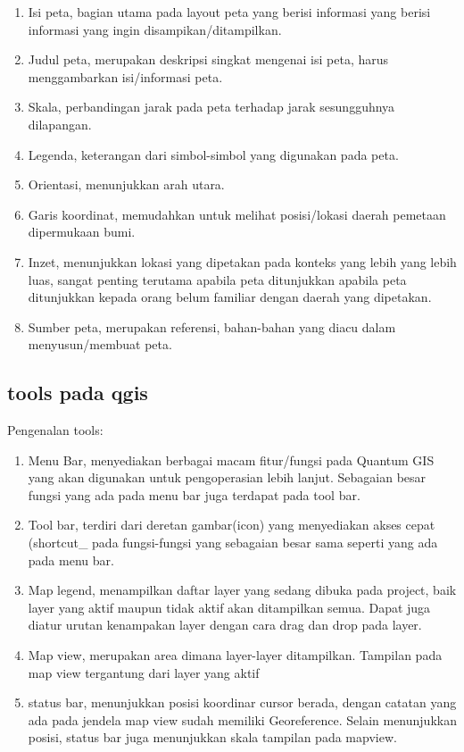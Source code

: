 	\begin{enumerate}
		\item Isi peta, bagian utama pada layout peta yang berisi informasi yang berisi informasi yang ingin disampikan/ditampilkan.
		\item Judul peta, merupakan deskripsi singkat mengenai isi peta, harus menggambarkan isi/informasi peta.
		\item Skala, perbandingan jarak pada peta terhadap jarak sesungguhnya dilapangan.
		\item Legenda, keterangan dari simbol-simbol yang digunakan pada peta.
		\item Orientasi, menunjukkan arah utara.
		\item Garis koordinat, memudahkan untuk melihat posisi/lokasi daerah pemetaan dipermukaan bumi.
		\item Inzet, menunjukkan lokasi yang dipetakan pada konteks yang lebih yang lebih luas, sangat penting terutama apabila peta ditunjukkan apabila  peta ditunjukkan kepada orang belum familiar dengan daerah yang dipetakan.
		\item Sumber peta, merupakan referensi, bahan-bahan yang diacu dalam menyusun/membuat peta.
	\end{enumerate}

	\subsection{tools pada qgis}
	Pengenalan tools:
	\begin{enumerate}
		\item Menu Bar, menyediakan berbagai macam fitur/fungsi pada Quantum GIS yang akan digunakan untuk pengoperasian lebih lanjut. Sebagaian besar fungsi yang ada pada menu bar juga terdapat pada tool bar.
		\item Tool bar, terdiri dari deretan gambar(icon) yang menyediakan akses cepat (shortcut\_ pada fungsi-fungsi yang sebagaian besar sama seperti yang ada pada menu bar.
		\item Map legend, menampilkan daftar layer yang sedang dibuka pada project, baik layer yang aktif maupun tidak aktif akan ditampilkan semua. Dapat juga diatur urutan kenampakan layer dengan cara drag dan drop pada layer.
		\item Map view, merupakan area dimana layer-layer ditampilkan. Tampilan pada map view tergantung dari layer yang aktif
		\item status bar, menunjukkan posisi koordinar cursor berada, dengan catatan yang ada pada jendela map view sudah memiliki Georeference. Selain menunjukkan posisi, status bar juga menunjukkan skala tampilan pada mapview.
	\end{enumerate}

